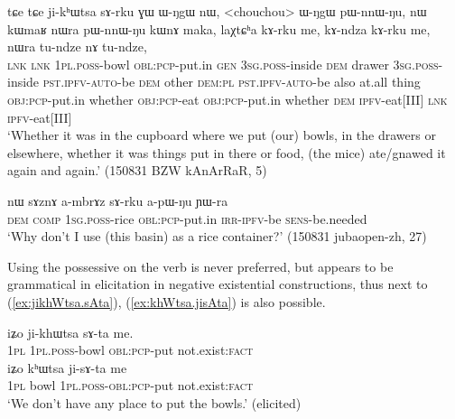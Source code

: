 \begin{exe}
\ex \label{ex:jikhWtsa.sArku}
\gll    tɕe tɕe ji-kʰɯtsa sɤ-rku ɣɯ ɯ-ŋgɯ nɯ, <chouchou> ɯ-ŋgɯ pɯ-nnɯ-ŋu, nɯ kɯmaʁ nɯra pɯ-nnɯ-ŋu kɯnɤ maka, laχtɕʰa kɤ-rku me, kɤ-ndza kɤ-rku me, nɯra tu-ndze nɤ tu-ndze, \\
\textsc{lnk} \textsc{lnk} \textsc{1pl}.\textsc{poss}-bowl \textsc{obl}:\textsc{pcp}-put.in \textsc{gen} \textsc{3sg}.\textsc{poss}-inside \textsc{dem} drawer \textsc{3sg}.\textsc{poss}-inside \textsc{pst}.\textsc{ipfv}-\textsc{auto}-be \textsc{dem} other \textsc{dem}:\textsc{pl} \textsc{pst}.\textsc{ipfv}-\textsc{auto}-be  also at.all thing \textsc{obj}:\textsc{pcp}-put.in whether \textsc{obj}:\textsc{pcp}-eat \textsc{obj}:\textsc{pcp}-put.in whether \textsc{dem} \textsc{ipfv}-eat[III] \textsc{lnk}  \textsc{ipfv}-eat[III] \\
\glt `Whether it was in the cupboard where we put (our) bowls, in the drawers or elsewhere, whether it was things put in there or food, (the mice) ate/gnawed it again and again.' (150831 BZW kAnArRaR, 5)
\end{exe} 

\begin{exe}
\ex \label{ex:ambrAz.sArku}
\gll  nɯ sɤznɤ a-mbrɤz sɤ-rku a-pɯ-ŋu ɲɯ-ra \\
\textsc{dem} \textsc{comp} \textsc{1sg}.\textsc{poss}-rice \textsc{obl}:\textsc{pcp}-put.in \textsc{irr}-\textsc{ipfv}-be \textsc{sens}-be.needed \\
\glt  `Why don't I use (this basin) as a rice container?' (150831 jubaopen-zh, 27)
\end{exe} 

Using the possessive on the verb is never preferred, but appears to be grammatical in elicitation in negative existential constructions, thus next to (\ref{ex:jikhWtsa.sAta}),  (\ref{ex:khWtsa.jisAta}) is also possible.
\begin{exe}
\ex
\begin{xlist}
\ex \label{ex:jikhWtsa.sAta}
\gll iʑo ji-khɯtsa sɤ-ta me. \\
\textsc{1pl} \textsc{1pl}.\textsc{poss}-bowl  \textsc{obl}:\textsc{pcp}-put not.exist:\textsc{fact} \\ 
\ex \label{ex:khWtsa.jisAta}
\gll iʑo kʰɯtsa ji-sɤ-ta me  \\
\textsc{1pl} bowl \textsc{1pl}.\textsc{poss}-\textsc{obl}:\textsc{pcp}-put not.exist:\textsc{fact} \\ 
\glt `We  don't have any place to put the bowls.' (elicited)
\end{xlist}
\end{exe} 


